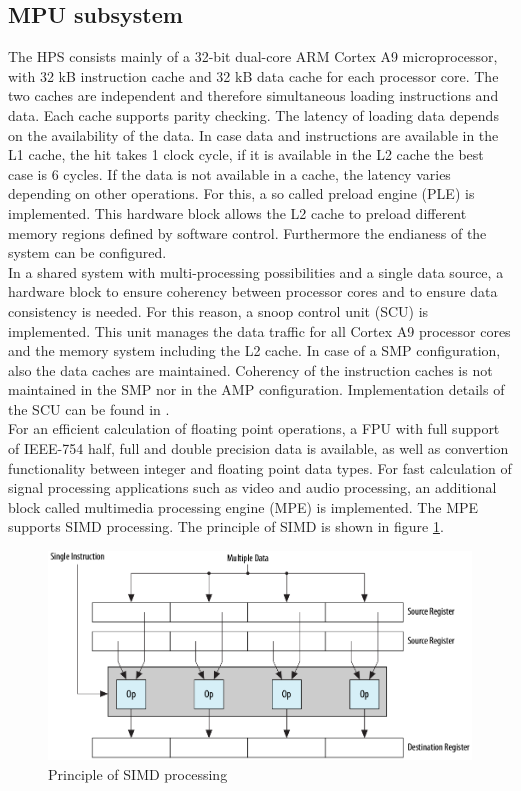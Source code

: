 \subsection{MPU subsystem}
The HPS consists mainly of a 32-bit dual-core ARM Cortex A9 microprocessor, with 32 kB instruction cache and 32 kB data cache for each processor core. The two caches are independent and therefore simultaneous loading  instructions and data. Each cache supports parity checking. The latency of loading data depends on the availability of the data. In case data and instructions are available in the L1 cache, the hit takes 1 clock cycle, if it is available in the L2 cache the best case is 6 cycles. If the data is not available in a cache, the latency varies depending on other operations. For this, a so called preload engine (PLE) is implemented. This hardware block allows the L2 cache to preload different memory regions defined by software control. Furthermore the endianess of the system can be configured.\\
In a shared system with multi-processing possibilities and a single data source, a hardware block to ensure coherency between processor cores and to ensure data consistency is needed. For this reason, a snoop control unit (SCU) is implemented. This unit manages the data traffic for all Cortex A9 processor cores and the memory system including the L2 cache. In case of a SMP configuration, also the data caches are maintained. Coherency of the instruction caches is not maintained in the SMP nor in the AMP configuration. Implementation details of the SCU can be found in \cite[chapter 9]{AlteraHPS15}.\\
For an efficient calculation of floating point operations, a FPU with full support of IEEE-754 half, full and double precision data is available, as well as convertion functionality between integer and floating point data types. For fast calculation of signal processing applications such as video and audio processing, an additional block called multimedia processing engine (MPE) is implemented. The MPE supports SIMD processing. The principle of SIMD is shown in figure \ref{fig:alterahpssimd}.
\begin{figure}[htbp]
\begin{center}
\includegraphics[width=12cm,keepaspectratio=true]{bilder/png/SIMD}
\caption{Principle of SIMD processing\cite[chapter 9]{AlteraHPS15}}
\label{fig:alterahpssimd}
\end{center}
\end{figure}
